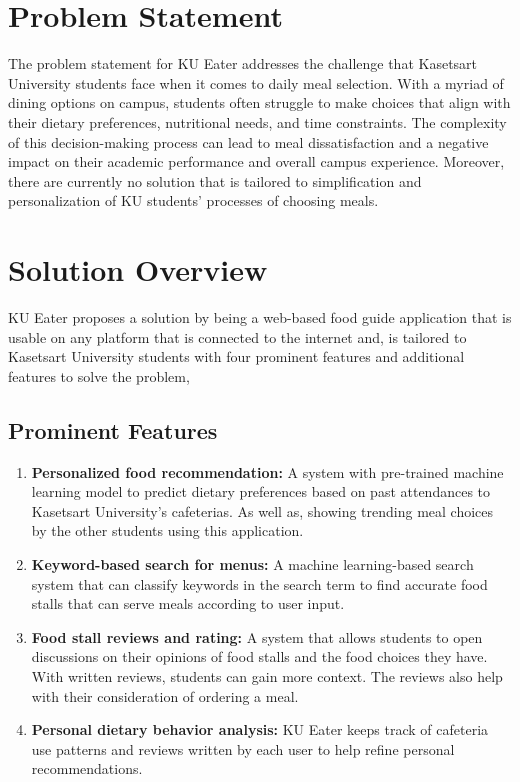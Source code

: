 \section{Problem Statement}
\label{section:problem-statement}

The problem statement for KU Eater addresses the challenge that Kasetsart University students face
when it comes to daily meal selection. With a myriad of dining options on campus, students often struggle to make choices
that align with their dietary preferences, nutritional needs, and time constraints. The complexity of this decision-making
process can lead to meal dissatisfaction and a negative impact on their academic performance and overall campus experience.
Moreover, there are currently no solution that is tailored to simplification and personalization of
KU students' processes of choosing meals.

\section{Solution Overview}
\label{section:solution-overview}

KU Eater proposes a solution by being a web-based food guide application that is usable on any platform that is connected to the internet and,
is tailored to Kasetsart University students with four prominent features and additional features to solve the problem,

\subsection{Prominent Features}
\label{subsection:main-features}

\begin{enumerate}[leftmargin=80pt]
    \item \textbf{Personalized food recommendation:} A system with pre-trained machine learning model to predict
    dietary preferences based on past attendances to Kasetsart University's cafeterias. As well as,
    showing trending meal choices by the other students using this application.
    \item \textbf{Keyword-based search for menus:} A machine learning-based search system that can classify keywords
    in the search term to find accurate food stalls that can serve meals according to user input.
    \item \textbf{Food stall reviews and rating:} A system that allows students to open discussions on their opinions
    of food stalls and the food choices they have. With written reviews, students can gain more context.
    The reviews also help with their consideration of ordering a meal.
    \item \textbf{Personal dietary behavior analysis:} KU Eater keeps track of cafeteria use patterns and reviews
    written by each user to help refine personal recommendations.
\end{enumerate}

